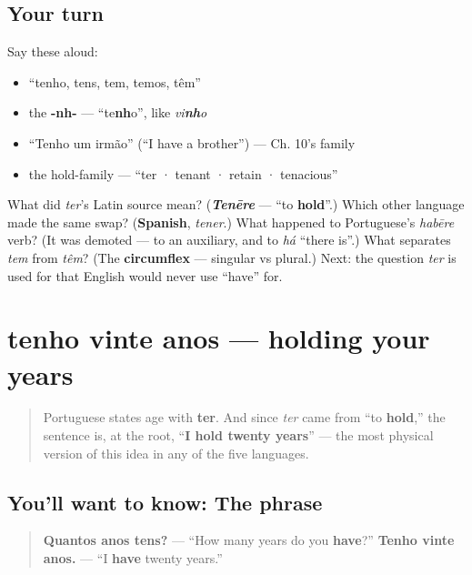 \subsection*{Your turn}
Say these aloud:

\begin{itemize}
\raggedright
  \item \textquotedblleft{}tenho, tens, tem, temos, têm\textquotedblright{}
  \item the \textbf{-nh-} — \textquotedblleft{}te\textbf{nh}o\textquotedblright{}, like \emph{vi\textbf{nh}o}
  \item \textquotedblleft{}Tenho um irmão\textquotedblright{} (\textquotedblleft{}I have a brother\textquotedblright{}) — Ch. 10's family
  \item the hold-family — \textquotedblleft{}ter · tenant · retain · tenacious\textquotedblright{}
\end{itemize}

\begin{tcolorbox}[breakable,colback=teal!4,colframe=teal!35!black,title={Before you move on}]
What did \emph{ter}'s Latin source mean? (\emph{\textbf{Tenēre}} — \textquotedblleft{}to \textbf{hold}\textquotedblright{}.) Which other language made the same swap? (\textbf{Spanish}, \emph{tener}.) What happened to Portuguese's \emph{habēre} verb? (It was demoted — to an auxiliary, and to \emph{há} \textquotedblleft{}there is\textquotedblright{}.) What separates \emph{tem} from \emph{têm}? (The \textbf{circumflex} — singular vs plural.) Next: the question \emph{ter} is used for that English would never use \textquotedblleft{}have\textquotedblright{} for.
\end{tcolorbox}
\section[tenho vinte anos]{tenho vinte anos — holding your years}

\label{lesson:PT-C14-idade}



\begin{quote}
Portuguese states age with \textbf{ter}. And since \emph{ter} came from \textquotedblleft{}to \textbf{hold},\textquotedblright{} the sentence is, at the root, \textquotedblleft{}\textbf{I hold twenty years}\textquotedblright{} — the most physical version of this idea in any of the five languages.
\end{quote}

\subsection*{You'll want to know: The phrase}
\begin{quote}
\textbf{Quantos anos tens?} — \textquotedblleft{}How many years do you \textbf{have}?\textquotedblright{} \textbf{Tenho vinte anos.} — \textquotedblleft{}I \textbf{have} twenty years.\textquotedblright{}
\end{quote}

